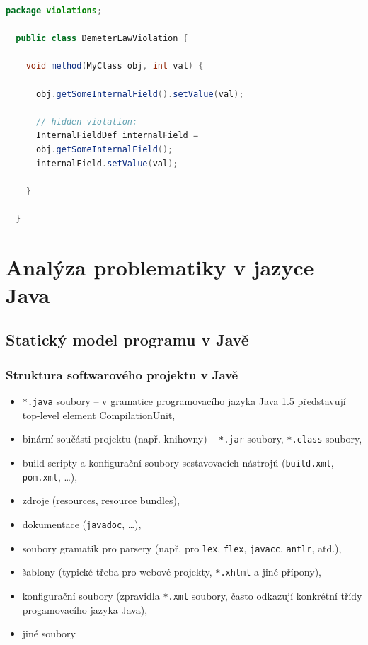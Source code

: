 \begin{lstlisting}[language=java]
  package violations;

  public class DemeterLawViolation {

    void method(MyClass obj, int val) {

      obj.getSomeInternalField().setValue(val);

      // hidden violation:
      InternalFieldDef internalField =
      obj.getSomeInternalField();
      internalField.setValue(val);

    }

  }
\end{lstlisting}

\section{Analýza problematiky v jazyce Java}

\subsection{Statický model programu v Javě}

\subsubsection{Struktura softwarového projektu v Javě}


\begin{itemize}
\item \verb+*.java+ soubory -- v gramatice programovacího jazyka Java 1.5 představují top-level element CompilationUnit,
\item binární součásti projektu (např. knihovny) -- \verb+*.jar+ soubory, \verb+*.class+ soubory,
\item build scripty a konfigurační soubory sestavovacích nástrojů (\verb+build.xml+, \verb+pom.xml+, \ldots),
\item zdroje (resources, resource bundles),
\item dokumentace (\verb+javadoc+, \ldots),
\item soubory gramatik pro parsery (např. pro \verb+lex+, \verb+flex+, \verb+javacc+, \verb+antlr+, atd.),
\item šablony (typické třeba pro webové projekty, \verb+*.xhtml+ a jiné přípony),
\item konfigurační soubory (zpravidla \verb+*.xml+ soubory, často odkazují konkrétní třídy progamovacího jazyka Java),
\item jiné soubory
\end{itemize}

